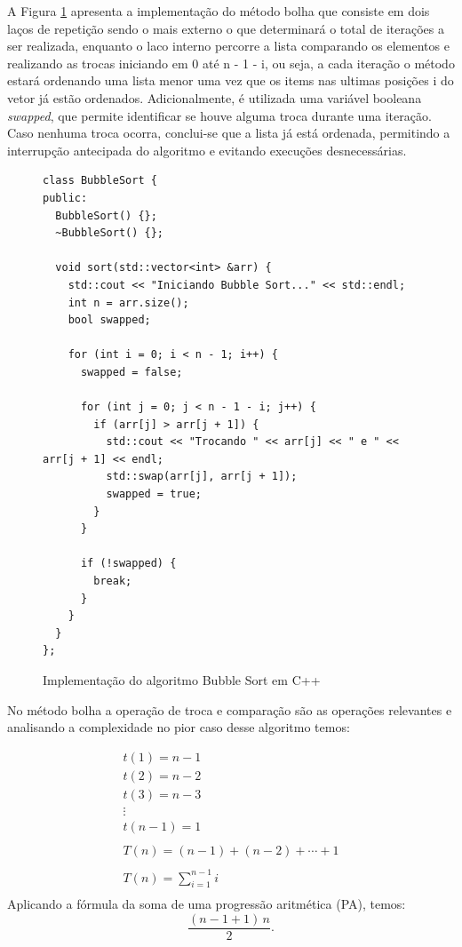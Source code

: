 \documentclass[
	article,			%
	11pt,				%
	oneside,			%
	a4paper,			%
	english,			%
	brazil,				%
	sumario=tradicional
	]{abntex2}
\begin{document}
A Figura \ref{fig:bubblesort} apresenta a implementação do método bolha que consiste em dois laços de repetição sendo o mais externo o que determinará o total de iterações a ser realizada, enquanto o laco interno percorre a lista comparando os elementos e realizando as trocas iniciando em 0 até n - 1 - i, ou seja, a cada iteração o método estará ordenando uma lista menor uma vez que os items nas ultimas posições i do vetor já estão ordenados. Adicionalmente, é utilizada uma variável booleana \textit{swapped}, que permite identificar se houve alguma troca durante uma iteração. Caso nenhuma troca ocorra, conclui-se que a lista já está ordenada, permitindo a interrupção antecipada do algoritmo e evitando execuções desnecessárias.
\begin{figure}[H]
\centering
\begin{lstlisting}[]
class BubbleSort {
public:
  BubbleSort() {};
  ~BubbleSort() {};

  void sort(std::vector<int> &arr) {
    std::cout << "Iniciando Bubble Sort..." << std::endl;
    int n = arr.size();
    bool swapped;

    for (int i = 0; i < n - 1; i++) {
      swapped = false;

      for (int j = 0; j < n - 1 - i; j++) {
        if (arr[j] > arr[j + 1]) {
          std::cout << "Trocando " << arr[j] << " e " << arr[j + 1] << endl;
          std::swap(arr[j], arr[j + 1]);
          swapped = true;
        }
      }

      if (!swapped) {
        break;
      }
    }
  }
};
\end{lstlisting}
\caption{Implementação do algoritmo Bubble Sort em C++}
\label{fig:bubblesort}
\end{figure}

No método bolha a operação de troca e comparação são as operações relevantes e analisando a complexidade no pior caso desse algoritmo temos:

\begin{equation}
\begin{gathered}
t(1) = n - 1 \\
t(2) = n - 2 \\
t(3) = n - 3 \\
\vdots \\
t(n-1) = 1 \\
\\
T(n) = (n-1) + (n-2) + \cdots + 1 \\
\\
T(n) = \sum_{i=1}^{n-1} i \\
\end{gathered}
\end{equation}
Aplicando a fórmula da soma de uma progressão aritmética (PA), temos:
\[
\frac{(n-1 + 1)\,n}{2}.
\]
\end{document}
